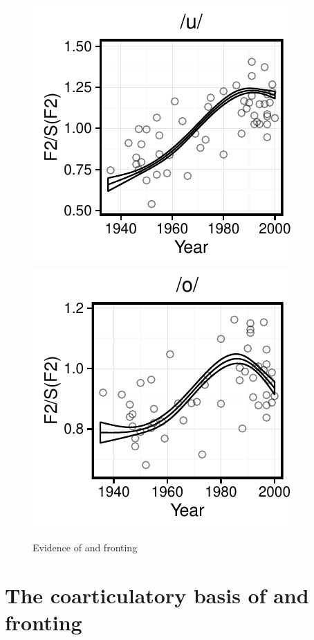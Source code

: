 \documentclass[12pt]{article}
\begin{document}
\begin{figure}[!htbp]
\centering
\includegraphics{uwchange}
\includegraphics{owchange}
\caption{Evidence of  and  fronting}
\end{figure}

\section{The coarticulatory basis of  and  fronting}
\end{document}
